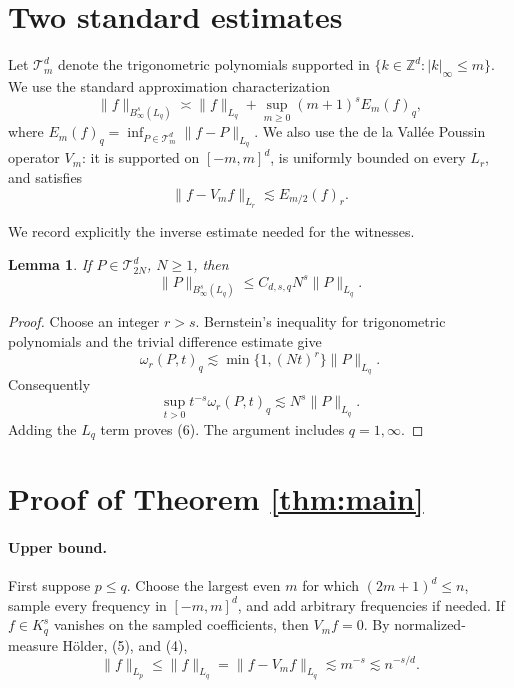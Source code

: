 \documentclass[11pt]{article}
\newtheorem{lemma}{Lemma}
\newcommand{\Z}{\mathbb Z}
\newcommand{\cT}{\mathcal T}
\begin{document}
\section{Two standard estimates}

Let \(\cT_m^d\) denote the trigonometric polynomials supported in
\(\{k\in\Z^d:|k|_\infty\leq m\}\).  We use the standard approximation
characterization
\[
 \|f\|_{B^s_\infty(L_q)}
 \asymp \|f\|_{L_q}
  +\sup_{m\geq0}(m+1)^s E_m(f)_q,                                \tag{4}
\]
where \(E_m(f)_q=\inf_{P\in\cT_m^d}\|f-P\|_{L_q}\).  We also use the
de la Vall\'ee Poussin operator \(V_m\): it is supported on
\([-m,m]^d\), is uniformly bounded on every \(L_r\), and satisfies
\[
                  \|f-V_mf\|_{L_r}\lesssim E_{m/2}(f)_r.         \tag{5}
\]

We record explicitly the inverse estimate needed for the witnesses.

\begin{lemma}\label{lem:inverse}
If \(P\in\cT_{2N}^d\), \(N\geq1\), then
\[
                 \|P\|_{B^s_\infty(L_q)}
                 \leq C_{d,s,q}N^s\|P\|_{L_q}.                  \tag{6}
\]
\end{lemma}

\begin{proof}
Choose an integer \(r>s\).  Bernstein's inequality for trigonometric
polynomials and the trivial difference estimate give
\[
 \omega_r(P,t)_q
 \lesssim \min\{1,(Nt)^r\}\|P\|_{L_q}.
\]
Consequently
\[
 \sup_{t>0}t^{-s}\omega_r(P,t)_q
 \lesssim N^s\|P\|_{L_q}.
\]
Adding the \(L_q\) term proves (6).  The argument includes
\(q=1,\infty\).
\end{proof}

\section{Proof of Theorem \ref{thm:main}}

\paragraph{Upper bound.}
First suppose \(p\leq q\).  Choose the largest even \(m\) for which
\((2m+1)^d\leq n\), sample every frequency in \([-m,m]^d\), and add
arbitrary frequencies if needed.  If \(f\in K_q^s\) vanishes on the sampled
coefficients, then \(V_mf=0\).  By normalized-measure H\"older, (5), and
(4),
\[
 \|f\|_{L_p}\leq\|f\|_{L_q}
 =\|f-V_mf\|_{L_q}
 \lesssim m^{-s}\lesssim n^{-s/d}.                              \tag{7}
\]
\end{document}
